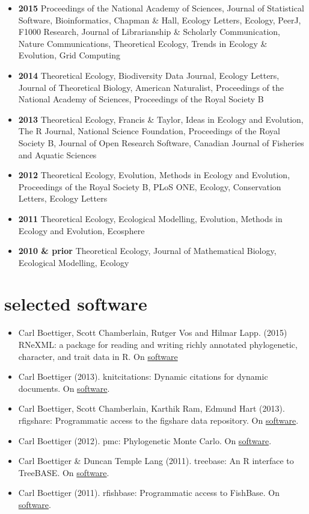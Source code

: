 \documentclass[10pt,sans]{moderncv}        %
\providecommand{\tightlist}{%
    \setlength{\itemsep}{0pt}\setlength{\parskip}{0pt}}
\begin{document}
\begin{itemize}
\item
  \textbf{2015} Proceedings of the National Academy of Sciences, Journal
  of Statistical Software, Bioinformatics, Chapman \& Hall, Ecology
  Letters, Ecology, PeerJ, F1000 Research, Journal of Librarianship \&
  Scholarly Communication, Nature Communications, Theoretical Ecology,
  Trends in Ecology \& Evolution, Grid Computing
\item
  \textbf{2014} Theoretical Ecology, Biodiversity Data Journal, Ecology
  Letters, Journal of Theoretical Biology, American Naturalist,
  Proceedings of the National Academy of Sciences, Proceedings of the
  Royal Society B
\item
  \textbf{2013} Theoretical Ecology, Francis \& Taylor, Ideas in Ecology
  and Evolution, The R Journal, National Science Foundation, Proceedings
  of the Royal Society B, Journal of Open Research Software, Canadian
  Journal of Fisheries and Aquatic Sciences
\item
  \textbf{2012} Theoretical Ecology, Evolution, Methods in Ecology and
  Evolution, Proceedings of the Royal Society B, PLoS ONE, Ecology,
  Conservation Letters, Ecology Letters
\item
  \textbf{2011} Theoretical Ecology, Ecological Modelling, Evolution,
  Methods in Ecology and Evolution, Ecosphere
\item
  \textbf{2010 \& prior} Theoretical Ecology, Journal of Mathematical
  Biology, Ecological Modelling, Ecology
\end{itemize}

\section{selected software}\label{selected-software}

\begin{itemize}
\tightlist
\item
  Carl Boettiger, Scott Chamberlain, Rutger Vos and Hilmar Lapp. (2015)
  RNeXML: a package for reading and writing richly annotated
  phylogenetic, character, and trait data in R. On
  \href{https://cran.rstudio.com/web/packages/RNeXML/}{software}
\item
  Carl Boettiger (2013). knitcitations: Dynamic citations for dynamic
  documents. On
  \href{http://cran.r-project.org/web/packages/knitcitations/}{software}.
\item
  Carl Boettiger, Scott Chamberlain, Karthik Ram, Edmund Hart (2013).
  rfigshare: Programmatic access to the figshare data repository. On
  \href{http://cran.r-project.org/web/packages/rfigshare/}{software}.
\item
  Carl Boettiger (2012). pmc: Phylogenetic Monte Carlo. On
  \href{https://cran.rstudio.com/web/packages/pmc/}{software}.
\item
  Carl Boettiger \& Duncan Temple Lang (2011). treebase: An R interface
  to TreeBASE. On
  \href{http://cran.r-project.org/web/packages/treebase/}{software}.
\item
  Carl Boettiger (2011). rfishbase: Programmatic access to FishBase. On
  \href{http://cran.r-project.org/web/packages/rfishbase/}{software}.
\end{itemize}
\end{document}
